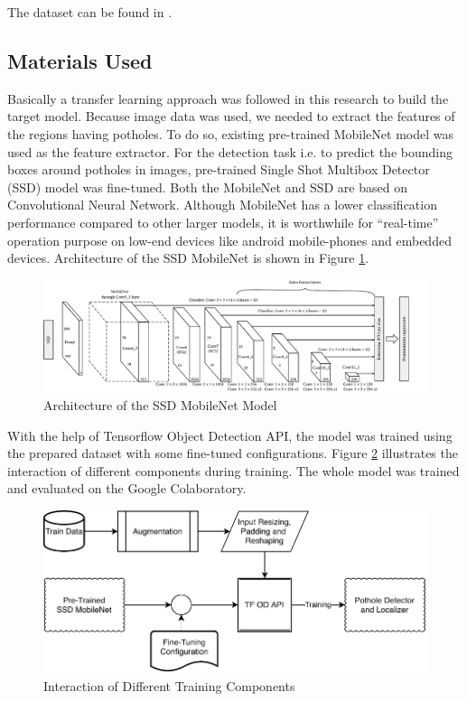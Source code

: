 \documentclass[conference]{IEEEtran}
\begin{document}
The dataset can be found in \cite{atik2020potholesdataset}.

\subsection{Materials Used}
Basically a transfer learning\cite{pan2009survey} approach was followed in this research to build the target model. Because image data was used, we needed to extract the features of the regions having potholes. To do so, existing pre-trained MobileNet\cite{howard2017mobilenets} model was used as the feature extractor. For the detection task i.e. to predict the bounding boxes around potholes in images, pre-trained Single Shot Multibox Detector (SSD)\cite{liu2016ssd} model was fine-tuned. Both the MobileNet\cite{howard2017mobilenets} and SSD are based on Convolutional Neural Network. Although MobileNet\cite{howard2017mobilenets} has a lower classification performance compared to other larger models\cite{tf_model_zoo}, it is worthwhile for ``real-time'' operation purpose on low-end devices like android mobile-phones and embedded devices.
Architecture of the SSD MobileNet\cite{liu2016ssd, howard2017mobilenets} is shown in Figure \ref{fig:ssd}.
     
\begin{figure}[h]
  \centering
  \includegraphics[width=.95\columnwidth]{img/ssd}
  \caption{Architecture of the SSD MobileNet Model}
  \label{fig:ssd}
\end{figure}
     
With the help of Tensorflow\cite{dillon2017tensorflow} Object Detection API, the model was trained using the prepared dataset with some fine-tuned configurations. Figure \ref{fig:workflow} illustrates the interaction of different components during training. The whole model was trained and evaluated on the Google Colaboratory\cite{bisong2019google}.
     
\begin{figure}[h]
  \centering
  \includegraphics[width=.98\columnwidth]{img/workflow}
  \caption{Interaction of Different Training Components}
  \label{fig:workflow}
\end{figure}
     
\end{document}
